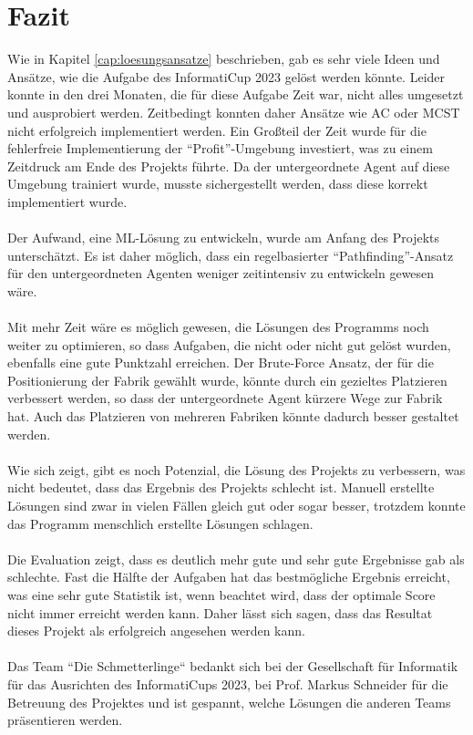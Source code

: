 \section{Fazit}\label{cap:fazit}
Wie in Kapitel \ref{cap:loesungsansatze} beschrieben, gab es sehr viele Ideen und Ansätze, wie die Aufgabe des \mbox{InformatiCup} 2023 gelöst werden könnte. Leider konnte in den drei Monaten, die für diese Aufgabe Zeit war, nicht alles umgesetzt und ausprobiert werden. Zeitbedingt konnten daher Ansätze wie AC oder MCST nicht erfolgreich implementiert werden. Ein Großteil der Zeit wurde für die fehlerfreie Implementierung der  “Profit”-Umgebung  investiert, was zu einem  Zeitdruck am Ende des Projekts führte. Da der untergeordnete Agent auf diese Umgebung trainiert wurde, musste sichergestellt werden, dass diese korrekt implementiert wurde.
\\\\
Der Aufwand, eine ML-Lösung zu entwickeln, wurde am Anfang des Projekts unterschätzt. Es ist daher möglich, dass ein regelbasierter “Pathfinding”-Ansatz für den untergeordneten Agenten weniger zeitintensiv zu entwickeln gewesen wäre.
\\\\
Mit mehr Zeit wäre es möglich gewesen, die Lösungen des Programms noch weiter zu optimieren, so dass Aufgaben, die nicht oder nicht gut gelöst wurden, ebenfalls eine gute Punktzahl erreichen. Der Brute-Force Ansatz, der für die Positionierung der Fabrik gewählt wurde, könnte durch ein gezieltes Platzieren verbessert werden, so dass der untergeordnete Agent kürzere Wege zur Fabrik hat. Auch das Platzieren von mehreren Fabriken könnte dadurch besser gestaltet werden.
\\\\
Wie sich zeigt, gibt es noch Potenzial, die Lösung des Projekts zu verbessern, was nicht bedeutet, dass das Ergebnis des Projekts schlecht ist. Manuell erstellte Lösungen sind zwar in vielen Fällen gleich gut oder sogar besser, trotzdem konnte das Programm menschlich erstellte Lösungen schlagen.
\\\\
Die Evaluation zeigt, dass es deutlich mehr gute und sehr gute Ergebnisse gab als schlechte. Fast die Hälfte der Aufgaben hat das bestmögliche Ergebnis erreicht, was eine sehr gute Statistik ist, wenn beachtet wird, dass der optimale Score nicht immer erreicht werden kann. Daher lässt sich sagen, dass das Resultat dieses Projekt als erfolgreich angesehen werden kann.
\\\\
Das Team “Die Schmetterlinge“ bedankt sich bei der Gesellschaft für Informatik für das Ausrichten des InformatiCups 2023, bei Prof. Markus Schneider für die Betreuung des Projektes und ist  gespannt, welche Lösungen die anderen Teams präsentieren werden.
